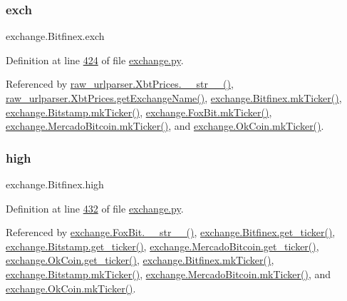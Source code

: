 \mbox{\label{classexchange_1_1_bitfinex_af5865e2fa72ee1706254ba963bfa10e9}} 
\subsubsection{\texorpdfstring{exch}{exch}}
{\footnotesize\ttfamily exchange.\+Bitfinex.\+exch}



Definition at line \hyperlink{exchange_8py_source_l00424}{424} of file \hyperlink{exchange_8py_source}{exchange.\+py}.



Referenced by \hyperlink{raw__urlparser_8py_source_l00074}{raw\+\_\+urlparser.\+Xbt\+Prices.\+\_\+\+\_\+str\+\_\+\+\_\+()}, \hyperlink{raw__urlparser_8py_source_l00068}{raw\+\_\+urlparser.\+Xbt\+Prices.\+get\+Exchange\+Name()}, \hyperlink{exchange_8py_source_l00453}{exchange.\+Bitfinex.\+mk\+Ticker()}, \hyperlink{exchange_8py_source_l00525}{exchange.\+Bitstamp.\+mk\+Ticker()}, \hyperlink{exchange_8py_source_l00584}{exchange.\+Fox\+Bit.\+mk\+Ticker()}, \hyperlink{exchange_8py_source_l00665}{exchange.\+Mercado\+Bitcoin.\+mk\+Ticker()}, and \hyperlink{exchange_8py_source_l00730}{exchange.\+Ok\+Coin.\+mk\+Ticker()}.

\mbox{\label{classexchange_1_1_bitfinex_a1380a7a7a3438e47785f10f68b0d61b9}} 
\subsubsection{\texorpdfstring{high}{high}}
{\footnotesize\ttfamily exchange.\+Bitfinex.\+high}



Definition at line \hyperlink{exchange_8py_source_l00432}{432} of file \hyperlink{exchange_8py_source}{exchange.\+py}.



Referenced by \hyperlink{exchange_8py_source_l00610}{exchange.\+Fox\+Bit.\+\_\+\+\_\+str\+\_\+\+\_\+()}, \hyperlink{exchange_8py_source_l00439}{exchange.\+Bitfinex.\+get\+\_\+ticker()}, \hyperlink{exchange_8py_source_l00511}{exchange.\+Bitstamp.\+get\+\_\+ticker()}, \hyperlink{exchange_8py_source_l00651}{exchange.\+Mercado\+Bitcoin.\+get\+\_\+ticker()}, \hyperlink{exchange_8py_source_l00716}{exchange.\+Ok\+Coin.\+get\+\_\+ticker()}, \hyperlink{exchange_8py_source_l00453}{exchange.\+Bitfinex.\+mk\+Ticker()}, \hyperlink{exchange_8py_source_l00525}{exchange.\+Bitstamp.\+mk\+Ticker()}, \hyperlink{exchange_8py_source_l00665}{exchange.\+Mercado\+Bitcoin.\+mk\+Ticker()}, and \hyperlink{exchange_8py_source_l00730}{exchange.\+Ok\+Coin.\+mk\+Ticker()}.

